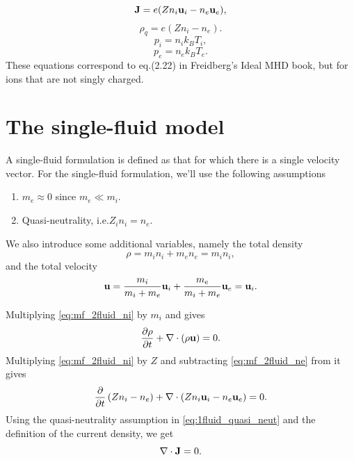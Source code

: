 \documentclass[a4paper,11pt]{report}
\begin{document}
\begin{equation}
    \label{eq:mf_2fluid_curr_density}
    \mathbf{J} = e (Z n_i \mathbf{u}_i - n_e \mathbf{u}_e),
\end{equation}
\begin{equation}
    \label{eq:mf_2fluid_mass_density}
    \rho_q = e (Z n_i - n_e).
\end{equation}
\begin{equation}
    \label{eq:mf_2fluid_eos_ion}
    p_i = n_i k_B T_i,
\end{equation}
\begin{equation}
    \label{eq:mf_2fluid_eos_elec}
    p_e = n_e k_B T_e.
\end{equation}
These equations correspond to eq.\@ (2.22) in Freidberg's Ideal MHD book, but for ions that are not singly charged.

\section{The single-fluid model}
\label{sec:1fluid_equations}

A single-fluid formulation is defined as that for which there is a single velocity vector. For the single-fluid formulation, we'll use the following assumptions
\begin{enumerate}
    \item $m_e \approx 0$ since $m_e \ll m_i$. \label{eq:1fluid_no_e_mass}
    \item Quasi-neutrality, i.e.\@ $Z_i n_i = n_e$. \label{eq:1fluid_quasi_neut}
\end{enumerate}
We also introduce some additional variables, namely the total density
\begin{equation}
    \label{eq:1fluid_rho_def}
    \rho = m_i n_i + m_e n_e = m_i n_i,
\end{equation}
and the total velocity
\begin{equation}
    \label{eq:1fluid_vel_def}
    \mathbf{u} = \frac{m_i}{m_i + m_e} \mathbf{u}_i + \frac{m_e}{m_i + m_e} \mathbf{u}_e = \mathbf{u}_i.
\end{equation}

Multiplying \cref{eq:mf_2fluid_ni} by $m_i$ and gives
\begin{equation}
    \label{eq:sf_1ion_ni}
    \frac{\partial \rho}{\partial t} + \nabla \cdot \left( \rho \mathbf{u} \right) = 0.
\end{equation}
Multiplying \cref{eq:mf_2fluid_ni} by $Z$ and subtracting \cref{eq:mf_2fluid_ne} from it gives
\begin{equation*}
    \frac{\partial}{\partial t} \left( Z n_i - n_e \right) + \nabla \cdot \left( Z n_i \mathbf{u}_i - n_e \mathbf{u}_e \right) = 0.
\end{equation*}
Using the quasi-neutrality assumption in \cref{eq:1fluid_quasi_neut} and the definition of the current density, we get
\begin{equation}
    \label{eq:sf_1ion_ne}
    \nabla \cdot \mathbf{J} = 0.
\end{equation}
\end{document}
